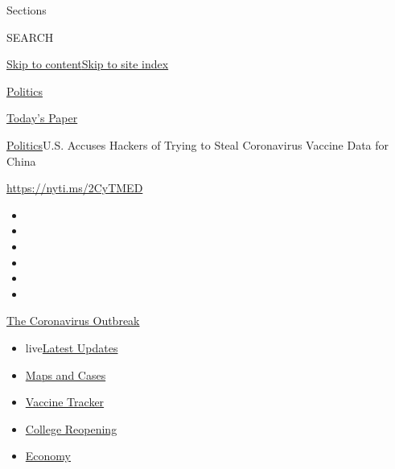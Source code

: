 Sections

SEARCH

\protect\hyperlink{site-content}{Skip to
content}\protect\hyperlink{site-index}{Skip to site index}

\href{https://www.nytimes3xbfgragh.onion/section/politics}{Politics}

\href{https://myaccount.nytimes3xbfgragh.onion/auth/login?response_type=cookie\&client_id=vi}{}

\href{https://www.nytimes3xbfgragh.onion/section/todayspaper}{Today's
Paper}

\href{/section/politics}{Politics}\textbar{}U.S. Accuses Hackers of
Trying to Steal Coronavirus Vaccine Data for China

\url{https://nyti.ms/2CyTMED}

\begin{itemize}
\item
\item
\item
\item
\item
\item
\end{itemize}

\href{https://www.nytimes3xbfgragh.onion/news-event/coronavirus?action=click\&pgtype=Article\&state=default\&region=TOP_BANNER\&context=storylines_menu}{The
Coronavirus Outbreak}

\begin{itemize}
\tightlist
\item
  live\href{https://www.nytimes3xbfgragh.onion/2020/08/04/world/coronavirus-covid-19.html?action=click\&pgtype=Article\&state=default\&region=TOP_BANNER\&context=storylines_menu}{Latest
  Updates}
\item
  \href{https://www.nytimes3xbfgragh.onion/interactive/2020/us/coronavirus-us-cases.html?action=click\&pgtype=Article\&state=default\&region=TOP_BANNER\&context=storylines_menu}{Maps
  and Cases}
\item
  \href{https://www.nytimes3xbfgragh.onion/interactive/2020/science/coronavirus-vaccine-tracker.html?action=click\&pgtype=Article\&state=default\&region=TOP_BANNER\&context=storylines_menu}{Vaccine
  Tracker}
\item
  \href{https://www.nytimes3xbfgragh.onion/2020/08/02/us/covid-college-reopening.html?action=click\&pgtype=Article\&state=default\&region=TOP_BANNER\&context=storylines_menu}{College
  Reopening}
\item
  \href{https://www.nytimes3xbfgragh.onion/live/2020/08/03/business/stock-market-today-coronavirus?action=click\&pgtype=Article\&state=default\&region=TOP_BANNER\&context=storylines_menu}{Economy}
\end{itemize}

